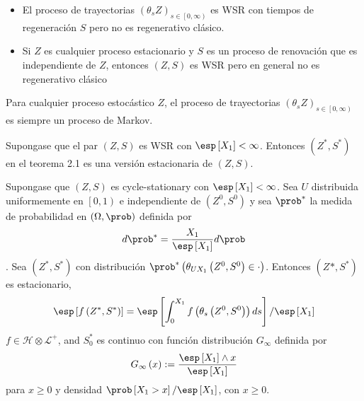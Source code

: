 \begin{Note}
\begin{itemize}
\item El proceso de trayectorias $\left(\theta_{s}Z\right)_{s\in\left[0,\infty\right)}$ es WSR con tiempos de regeneraci\'on $S$ pero no es regenerativo cl\'asico.

\item Si $Z$ es cualquier proceso estacionario y $S$ es un proceso de renovaci\'on que es independiente de $Z$, entonces $\left(Z,S\right)$ es WSR pero en general no es regenerativo cl\'asico

\end{itemize}

\end{Note}


\begin{Note}
Para cualquier proceso estoc\'astico $Z$, el proceso de trayectorias $\left(\theta_{s}Z\right)_{s\in\left[0,\infty\right)}$ es siempre un proceso de Markov.
\end{Note}



\begin{Teo}
Supongase que el par $\left(Z,S\right)$ es WSR con $\esp\left[X_{1}\right]<\infty$. Entonces $\left(Z^{*},S^{*}\right)$ en el teorema 2.1 es una versi\'on estacionaria de 
$\left(Z,S\right)$.
\end{Teo}


\begin{Teo}
Supongase que $\left(Z,S\right)$ es cycle-stationary con $\esp\left[X_{1}\right]<\infty$. Sea $U$ distribuida uniformemente en $\left[0,1\right)$ e independiente de $\left(Z^{0},S^{0}\right)$ y sea $\prob^{*}$ la medida de probabilidad en $\left(\Omega,\prob\right)$ definida por $$d\prob^{*}=\frac{X_{1}}{\esp\left[X_{1}\right]}d\prob$$. Sea $\left(Z^{*},S^{*}\right)$ con distribuci\'on $\prob^{*}\left(\theta_{UX_{1}}\left(Z^{0},S^{0}\right)\in\cdot\right)$. Entonces $\left(Z^{}*,S^{*}\right)$ es estacionario,
\begin{eqnarray*}
\esp\left[f\left(Z^{*},S^{*}\right)\right]=\esp\left[\int_{0}^{X_{1}}f\left(\theta_{s}\left(Z^{0},S^{0}\right)\right)ds\right]/\esp\left[X_{1}\right]
\end{eqnarray*}
$f\in\mathcal{H}\otimes\mathcal{L}^{+}$, and $S_{0}^{*}$ es continuo con funci\'on distribuci\'on $G_{\infty}$ definida por $$G_{\infty}\left(x\right):=\frac{\esp\left[X_{1}\right]\wedge x}{\esp\left[X_{1}\right]}$$ para $x\geq0$ y densidad $\prob\left[X_{1}>x\right]/\esp\left[X_{1}\right]$, con $x\geq0$.

\end{Teo}


